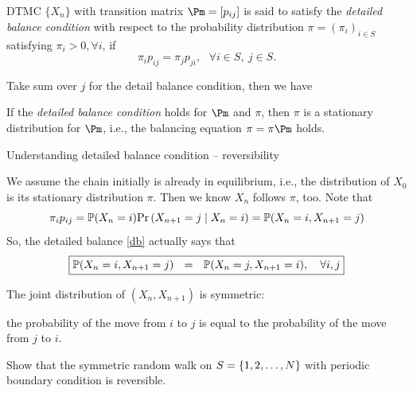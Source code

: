 \documentclass[english,10pt]{beamer}
\begin{document}
\begin{frame}

\begin{definition}
DTMC $\{X_n\}$ with transition matrix $\Pm=[p_{ij}]$ is said to satisfy
the {\it detailed balance condition} with   respect to the probability
distribution $\pi=(\pi_i)_{i\in S}$ satisfying  $\pi_i>0,\forall i$, if 
\begin{equation}\label{db}
 \pi_i p_{ij} = \pi_j p_{ji}, ~~~\forall i\in S, ~j \in S. 
 \end{equation}
\end{definition}

 \bigskip
Take sum over $j$ for the detail balance condition, then we have 
\begin{theorem}
If the {\it detailed balance condition} holds for $\Pm$ and $\pi$, 
then $\pi$ is a stationary distribution for $\Pm$, i.e.,
the balancing equation 
$ \pi = \pi \Pm$
holds.
\end{theorem}



\end{frame}



\begin{frame}
{Understanding detailed balance condition -- reversibility }


We assume the chain initially is already in equilibrium, i.e., 
the distribution of $X_0$ is its stationary distribution $\pi$.
Then we know $X_n$ follows $\pi$, too.
Note that 
\[ \pi_i p_{ij}  =\mathbb{P}(X_{n}=i) {\Pr\left(X_{n+1}=j\mid X_n=i\right)}=\mathbb{P}(X_n=i, X_{n+1}=j)\]
So, the detailed balance \eqref{db} actually says that
\[ \boxed{\mathbb{P}(X_n=i, X_{n+1}=j) ~~=~~ \mathbb{P}(X_n=j, X_{n+1}=i) , ~~~\forall i,j }\]

\bigskip 
The joint distribution of $(X_n, X_{n+1})$ is symmetric: \par
the probability of the move from $i$  to $j$
is equal to the probability of the move from $j$ to $i$.
\begin{ex}
Show that the symmetric random walk on $S=\left\{1,2,\ldots, N\right\}$ with periodic boundary condition
is reversible.
\end{ex}

\end{frame}
\end{document}
